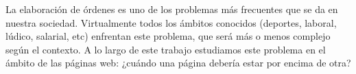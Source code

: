 La elaboraci\'on de \'ordenes es uno de los problemas m\'as frecuentes que se
da en nuestra sociedad. Virtualmente todos los \'ambitos conocidos (deportes,
laboral, l\'udico, salarial, etc) enfrentan este problema, que ser\'a m\'as o
menos complejo seg\'un el contexto. A lo largo de este trabajo estudiamos este
problema en el \'ambito de las p\'aginas web: ¿cu\'ando una p\'agina deber\'ia
estar por encima de otra?
